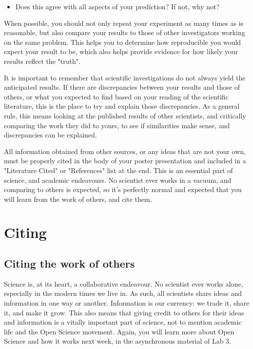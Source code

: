 \documentclass[
]{book}
\providecommand{\tightlist}{%
  \setlength{\itemsep}{0pt}\setlength{\parskip}{0pt}}
\begin{document}
\begin{itemize}
\tightlist
\item
  Does this agree with all aspects of your prediction? If not, why not?
\end{itemize}

When possible, you should not only repeat your experiment as many times as is reasonable, but also compare your results to those of other investigators working on the same problem. This helps you to determine how reproducible you would expect your result to be, which also helps provide evidence for how likely your results reflect the "truth".

It is important to remember that scientific investigations do not always yield the anticipated results. If there are discrepancies between your results and those of others, or what you expected to find based on your reading of the scientific literature, this is the place to try and explain those discrepancies. As a general rule, this means looking at the published results of other scientists, and critically comparing the work they did to yours, to see if similarities make sense, and discrepancies can be explained.

All information obtained from other sources, or any ideas that are not your own, must be properly cited in the body of your poster presentation and included in a "Literature Cited" or "References" list at the end. This is an essential part of science, and academic endeavours. No scientist ever works in a vacuum, and comparing to others is expected, so it's perfectly normal and expected that you will learn from the work of others, and cite them.

\hypertarget{citing}{%
\section*{Citing}\label{citing}}

\hypertarget{citing-the-work-of-others}{%
\subsection*{Citing the work of others}\label{citing-the-work-of-others}}

Science is, at its heart, a collaborative endeavour. No scientist ever works alone, especially in the modern times we live in. As such, all scientists share ideas and information in one way or another. Information is our currency: we trade it, share it, and make it grow. This also means that giving credit to others for their ideas and information is a vitally important part of science, not to mention academic life and the Open Science movement. Again, you will learn more about Open Science and how it works next week, in the asynchronous material of Lab 3.
\end{document}
